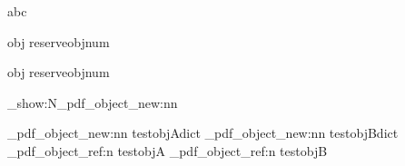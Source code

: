 \documentclass{article}
\begin{document}
\makeatletter%

abc%

\pdfextension obj reserveobjnum 
\the\pdflastobj

\pdfextension obj reserveobjnum
\the\pdflastobj

\ExplSyntaxOn

\cs_show:N\driver_pdf_object_new:nn

\driver_pdf_object_new:nn {testobjA}{dict}
\driver_pdf_object_new:nn {testobjB}{dict}
\driver_pdf_object_ref:n {testobjA}
\driver_pdf_object_ref:n {testobjB}
\ExplSyntaxOff
\end{document}
